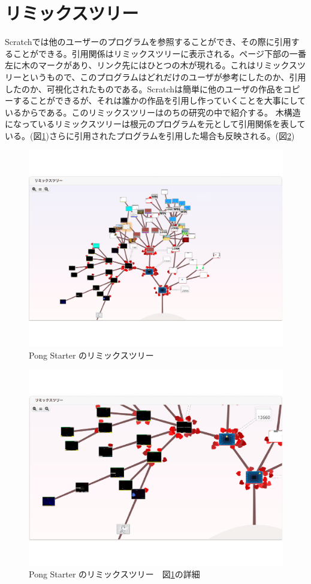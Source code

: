 \documentclass[a4paper,10pt,onecolumn,oneside,openany]{jsbook}
\begin{document}
\section{リミックスツリー}
Scratchでは他のユーザーのプログラムを参照することができ、その際に引用することができる。引用関係はリミックスツリーに表示される。ページ下部の一番左に木のマークがあり、リンク先にはひとつの木が現れる。これはリミックスツリーというもので、このプログラムはどれだけのユーザが参考にしたのか、引用したのか、可視化されたものである。Scratchは簡単に他のユーザの作品をコピーすることができるが、それは誰かの作品を引用し作っていくことを大事にしているからである。このリミックスツリーはのちの研究の中で紹介する。
木構造になっているリミックスツリーは根元のプログラムを元として引用関係を表している。(図\ref{psrt})さらに引用されたプログラムを引用した場合も反映される。(図\ref{rtdit})

\begin{figure}[ht]
  \centering
    \includegraphics[scale=0.5]{graphic/remixtree_all.pdf}
  \caption{Pong Starter のリミックスツリー}
  \label{psrt}
 \end{figure}

\begin{figure}[hb]
  \centering
    \includegraphics[scale=0.5]{graphic/remixtree_detail.pdf}
  \caption{Pong Starter のリミックスツリー　図\ref{psrt}の詳細}
  \label{rtdit}
 \end{figure}
\end{document}
